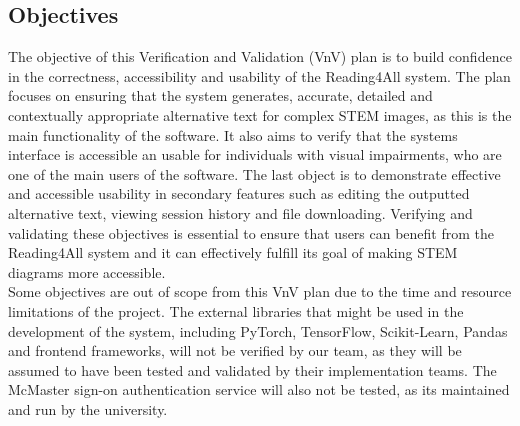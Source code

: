 \documentclass[12pt, titlepage]{article}
\begin{document}
\subsection{Objectives}






The objective of this Verification and Validation (VnV) plan is to build confidence in the correctness, accessibility and usability of the Reading4All system. 
The plan focuses on ensuring that the system generates, accurate, detailed and contextually appropriate alternative text for complex STEM images, as this is the main functionality of the software. 
It also aims to verify that the systems interface is accessible an usable for individuals with visual impairments, who are one of the main users of the software. The last object is to demonstrate effective and accessible usability in secondary features
such as editing the outputted alternative text, viewing session history and file downloading. 
Verifying and validating these objectives is essential to ensure that users can benefit from the Reading4All system and 
it can effectively fulfill its goal of making STEM diagrams more accessible.
\\

Some objectives are out of scope from this VnV plan due to the time and resource limitations of the project.
The external libraries that might be used in the development of the system, including PyTorch, TensorFlow, Scikit-Learn, Pandas and frontend frameworks, will not be verified by our team, as they will be assumed to have been tested and validated by their implementation teams. 
The McMaster sign-on authentication service will also not be tested, as its maintained and run by the university.
\end{document}
